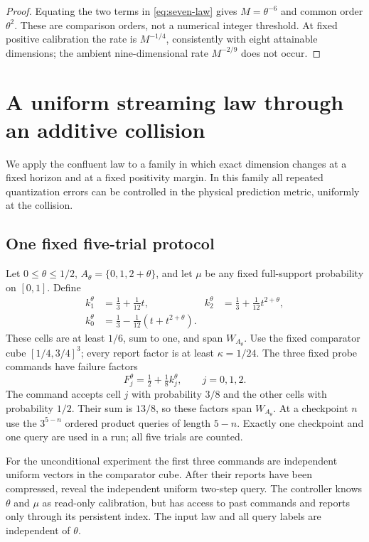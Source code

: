 \documentclass[11pt]{amsart}
\theoremstyle{definition}\newtheorem{definition}[theorem]{Definition}
\theoremstyle{remark}\newtheorem{remark}[theorem]{Remark}
\begin{document}
\begin{proof}
Equating the two terms in \eqref{eq:seven-law} gives
$M=\theta^{-6}$ and common order $\theta^2$. These are comparison
orders, not a numerical integer threshold. At fixed positive calibration
the rate is $M^{-1/4}$, consistently with eight attainable dimensions;
the ambient nine-dimensional rate $M^{-2/9}$ does not occur.
\end{proof}

\section{A uniform streaming law through an additive collision}\label{sec:uniform}
We apply the confluent law to a family in which exact dimension changes
at a fixed horizon and at a fixed positivity margin. In this family all
repeated quantization errors can be controlled in the physical prediction
metric, uniformly at the collision.

\subsection{One fixed five-trial protocol}
Let $0\le\theta\le1/2$, $A_\theta=\{0,1,2+\theta\}$, and let $\mu$
be any fixed full-support probability on $[0,1]$. Define
\begin{equation}\label{eq:near-collision-cells}
 \begin{aligned}
 k_1^\theta&=\tfrac13+\tfrac1{12}t,&
 k_2^\theta&=\tfrac13+\tfrac1{12}t^{2+\theta},\\
 k_0^\theta&=\tfrac13-\tfrac1{12}(t+t^{2+\theta}).
 \end{aligned}
\end{equation}
These cells are at least $1/6$, sum to one, and span $W_{A_\theta}$.
Use the fixed comparator cube $[1/4,3/4]^3$; every report factor is at
least $\kappa=1/24$. The three fixed probe commands have failure factors
\begin{equation}\label{eq:common-near-probes}
 F_j^\theta=\tfrac12+\tfrac18 k_j^\theta,\qquad j=0,1,2.
\end{equation}
The command accepts cell $j$ with probability $3/8$ and the other cells
with probability $1/2$. Their sum is $13/8$, so these factors span
$W_{A_\theta}$. At a checkpoint $n$ use the $3^{5-n}$ ordered product
queries of length $5-n$. Exactly one checkpoint and one query are used
in a run; all five trials are counted.

For the unconditional experiment the first three commands are independent
uniform vectors in the comparator cube. After their reports have been
compressed, reveal the independent uniform two-step query. The controller
knows $\theta$ and $\mu$ as read-only calibration, but has access to past
commands and reports only through its persistent index. The input law and
all query labels are independent of $\theta$.
\end{document}
